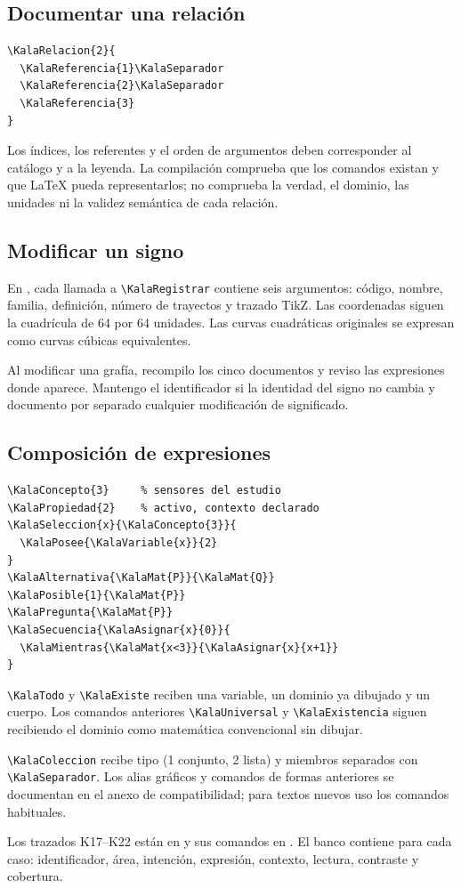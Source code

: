 \subsection{Documentar una relación}

\begin{Verbatim}[fontsize=\small,frame=single]
\KalaRelacion{2}{
  \KalaReferencia{1}\KalaSeparador
  \KalaReferencia{2}\KalaSeparador
  \KalaReferencia{3}
}
\end{Verbatim}

Los índices, los referentes y el orden de argumentos deben corresponder al
catálogo y a la leyenda. La compilación comprueba que los comandos existan y
que LaTeX pueda representarlos; no comprueba la verdad, el dominio, las
unidades ni la validez semántica de cada relación.

\subsection{Modificar un signo}

En , cada llamada a
\texttt{\textbackslash KalaRegistrar} contiene seis argumentos:
código, nombre, familia, definición, número de trayectos y trazado TikZ.
Las coordenadas siguen la cuadrícula de 64 por 64 unidades. Las curvas
cuadráticas originales se expresan como curvas cúbicas equivalentes.

Al modificar una grafía, recompilo los cinco documentos y reviso las
expresiones donde aparece. Mantengo el identificador si la identidad del signo
no cambia y documento por separado cualquier modificación de significado.

\subsection{Composición de expresiones}
\begin{Verbatim}[fontsize=\small,frame=single]
\KalaConcepto{3}     % sensores del estudio
\KalaPropiedad{2}    % activo, contexto declarado
\KalaSeleccion{x}{\KalaConcepto{3}}{
  \KalaPosee{\KalaVariable{x}}{2}
}
\KalaAlternativa{\KalaMat{P}}{\KalaMat{Q}}
\KalaPosible{1}{\KalaMat{P}}
\KalaPregunta{\KalaMat{P}}
\KalaSecuencia{\KalaAsignar{x}{0}}{
  \KalaMientras{\KalaMat{x<3}}{\KalaAsignar{x}{x+1}}
}
\end{Verbatim}
\texttt{\textbackslash KalaTodo} y \texttt{\textbackslash KalaExiste} reciben
una variable, un dominio ya dibujado y un cuerpo. Los comandos anteriores
\texttt{\textbackslash KalaUniversal} y \texttt{\textbackslash KalaExistencia}
siguen recibiendo el dominio como matemática convencional sin dibujar.

\texttt{\textbackslash KalaColeccion} recibe tipo (1 conjunto, 2 lista) y miembros
separados con \texttt{\textbackslash KalaSeparador}. Los alias gráficos y comandos de formas anteriores se documentan en el anexo
de compatibilidad; para textos nuevos uso los comandos habituales.

Los trazados K17--K22 están en  y sus comandos en
. El banco  contiene para cada caso:
identificador, área, intención, expresión, contexto, lectura, contraste y cobertura.
